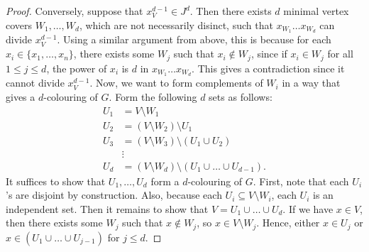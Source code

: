 \documentclass[../main.tex]{subfiles}
\begin{document}
\begin{proof}
        Conversely, suppose that $x_V^{d-1}\in J^d$. Then there exists $d$ minimal vertex covers $W_1,\dots, W_d$, which are not necessarily disinct, such that $x_{W_1}\dots x_{W_d}$ can divide $x_V^{d-1}$. Using a similar argument from above, this is because for each $x_i\in \{x_1,\dots,x_n\}$, there exists some $W_j$ such that $x_i\notin W_j$, since if $x_i\in W_j$ for all $1\leq j\leq d$, the power of $x_i$ is $d$ in $x_{W_1}\dots x_{W_d}$. This gives a contradiction since it cannot divide $x_V^{d-1}$. Now, we want to form complements of $W_i$ in a way that gives a $d$-colouring of $G$. Form the following $d$ sets as follows:
        \begin{align*}
            U_1 &= V\setminus W_1 \\
            U_2 &= (V\setminus W_2) \setminus U_1 \\
            U_3 &= (V\setminus W_3) \setminus (U_1\cup U_2) \\
            &\vdots \\
            U_d &= (V\setminus W_d) \setminus (U_1\cup\dots \cup U_{d-1}).
        \end{align*}
        It suffices to show that $U_1,\dots , U_d$ form a $d$-colouring of $G$. First, note that each $U_i$'s are disjoint by construction. Also, because each $U_i\subseteq V\setminus W_i$, each $U_i$ is an independent set. Then it remains to show that $V=U_1\cup\dots\cup U_d$. If we have $x\in V$, then there exists some $W_j$ such that $x\notin W_j$, so $x\in V\setminus W_j$. Hence, either $x\in U_j$ or $x\in (U_1\cup\dots\cup U_{j-1})$ for $j\leq d$.

        




    \end{proof}
\end{document}
